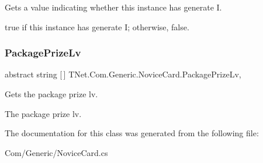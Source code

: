 Gets a value indicating whether this instance has generate I. 

{\ttfamily true} if this instance has generate I; otherwise, {\ttfamily false}.\mbox{\label{class_t_net_1_1_com_1_1_generic_1_1_novice_card_a06c38204b7a0e49bf453ee0e341b2505}} 
\subsubsection{\texorpdfstring{Package\+Prize\+Lv}{PackagePrizeLv}}
{\footnotesize\ttfamily abstract string \mbox{[}$\,$\mbox{]} T\+Net.\+Com.\+Generic.\+Novice\+Card.\+Package\+Prize\+Lv\hspace{0.3cm}{\ttfamily [get]}, {\ttfamily [protected]}}



Gets the package prize lv. 

The package prize lv.

The documentation for this class was generated from the following file\+:\begin{DoxyCompactItemize}
\item 
Com/\+Generic/Novice\+Card.\+cs\end{DoxyCompactItemize}
